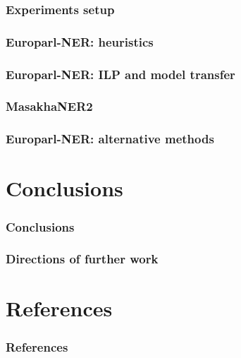 \documentclass{beamer}
\begin{document}
\begin{frame}
  \frametitle{Experiments setup}
\end{frame}

\begin{frame}
  \frametitle{Europarl-NER: heuristics}
\end{frame}

\begin{frame}
  \frametitle{Europarl-NER: ILP and model transfer}
\end{frame}

\begin{frame}
  \frametitle{MasakhaNER2}
\end{frame}

\begin{frame}
  \frametitle{Europarl-NER: alternative methods}
\end{frame}

\section{Conclusions}

\begin{frame}
  \frametitle{Conclusions}
\end{frame}

\begin{frame}
  \frametitle{Directions of further work}
\end{frame}

\section*{References}

\begin{frame}[allowframebreaks]
  \frametitle{References}

  
  
\end{frame}
\end{document}
